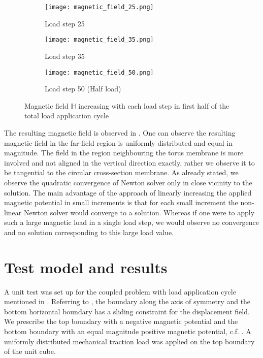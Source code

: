 \begin{figure}[h]
\centering
\begin{subfigure}{0.32\textwidth}
\centering
\texttt{[image: magnetic\_field\_25.png]}
\caption{Load step 25}
\label{fig:3.7.1}
\end{subfigure}
\begin{subfigure}{0.32\textwidth}
\centering
\texttt{[image: magnetic\_field\_35.png]}
\caption{Load step 35}
\label{fig:3.7.2}
\end{subfigure}
\begin{subfigure}{0.32\textwidth}
\centering
\texttt{[image: magnetic\_field\_50.png]}
\caption{Load step 50 (Half load)}
\label{fig:3.7.3}
\end{subfigure}
\caption{Magnetic field $\mathbb{H}$ increasing with each load step in first half of the total load application cycle}
\label{fig:3.7}
\end{figure}

The resulting magnetic field is observed in . One can observe the resulting magnetic field in the far-field region is uniformly distributed and equal in magnitude. The field in the region neighbouring the torus membrane is more involved and not aligned in the vertical direction exactly, rather we observe it to be tangential to the circular cross-section membrane. As already stated, we observe the quadratic convergence of Newton solver only in close vicinity to the solution. The main advantage of the approach of linearly increasing the applied magnetic potential in small increments is that for each small increment the non-linear Newton solver would converge to a solution. Whereas if one were to apply such a large magnetic load in a single load step, we would observe no convergence and no solution corresponding to this large load value. \par 

\section{Test model and results}
\label{sec:unit_test_coup}
A unit test was set up for the coupled problem with load application cycle mentioned in . Referring to , the boundary along the axis of symmetry and the bottom horizontal boundary has a sliding constraint for the displacement field. We prescribe the top boundary with a negative magnetic potential and the bottom boundary with an equal magnitude positive magnetic potential, c.f. . A uniformly distributed mechanical traction load was applied on the top boundary of the unit cube. \par 


